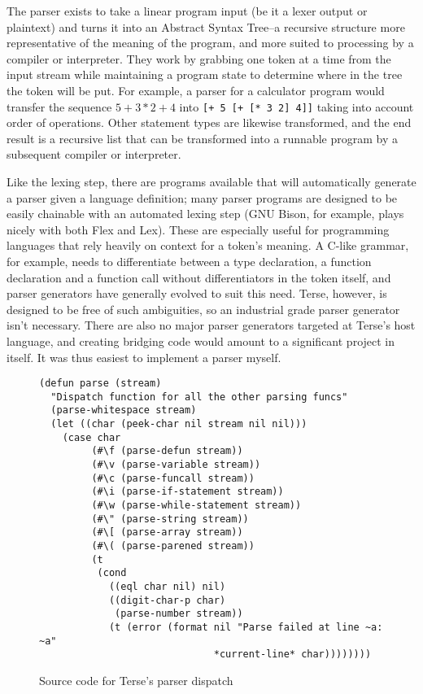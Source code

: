 \documentclass[12pt]{report}
\newcommand{\code}[1]{\texttt{#1}}
\begin{document}
The parser exists to take a linear program input (be it a lexer output
or plaintext) and turns it into an Abstract Syntax Tree--a recursive
structure more representative of the meaning of the program, and more
suited to processing by a compiler or interpreter. They work by
grabbing one token at a time from the input stream while maintaining a
program state to determine where in the tree the token will be
put. For example, a parser for a calculator program would transfer the
sequence $5 + 3 * 2 + 4$ into \code{[+ 5 [+ [* 3 2] 4]]} taking into
account order of operations. Other statement types are likewise
transformed, and the end result is a recursive list that can be
transformed into a runnable program by a subsequent compiler or
interpreter.

Like the lexing step, there are programs available that will
automatically generate a parser given a language definition; many
parser programs are designed to be easily chainable with an automated
lexing step (GNU Bison\cite{bison}, for example, plays nicely with
both Flex and Lex). These are especially useful for programming
languages that rely heavily on context for a token's meaning. A C-like
grammar, for example, needs to differentiate between a type
declaration, a function declaration and a function call without
differentiators in the token itself, and parser generators have
generally evolved to suit this need. Terse, however, is designed to be
free of such ambiguities, so an industrial grade parser generator
isn't necessary. There are also no major parser generators targeted at
Terse's host language, and creating bridging code would amount to a
significant project in itself. It was thus easiest to implement a
parser myself.

\begin{figure}
\begin{verbatim}
(defun parse (stream)
  "Dispatch function for all the other parsing funcs"
  (parse-whitespace stream)
  (let ((char (peek-char nil stream nil nil)))
    (case char
         (#\f (parse-defun stream))
         (#\v (parse-variable stream))
         (#\c (parse-funcall stream))
         (#\i (parse-if-statement stream))
         (#\w (parse-while-statement stream))
         (#\" (parse-string stream))
         (#\[ (parse-array stream))
         (#\( (parse-parened stream))
         (t
          (cond
            ((eql char nil) nil)
            ((digit-char-p char)
             (parse-number stream))
            (t (error (format nil "Parse failed at line ~a: ~a"
                              *current-line* char))))))))
\end{verbatim}
\caption{Source code for Terse's parser dispatch}
\end{figure}
\end{document}
